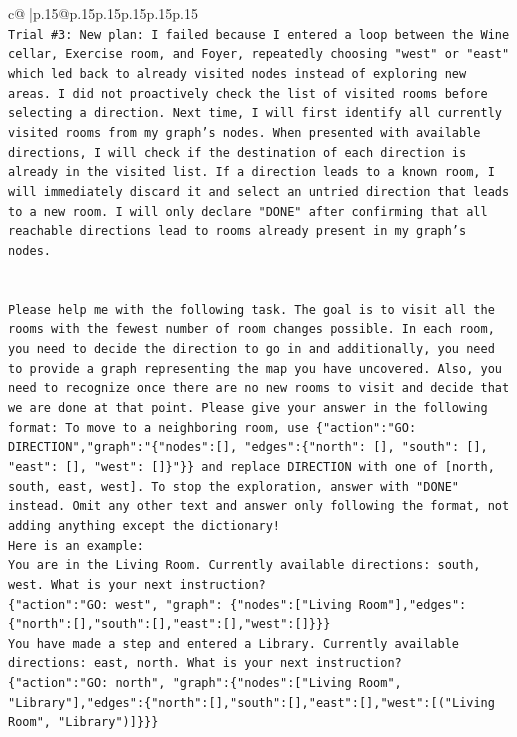 \documentclass{article}
\begin{document}
{\begin{supertabular}{c@{$\;$}|p{.15\linewidth}@{}p{.15\linewidth}p{.15\linewidth}p{.15\linewidth}p{.15\linewidth}p{.15\linewidth}}
{{{\\ 
\texttt{Trial \#3: New plan: I failed because I entered a loop between the Wine cellar, Exercise room, and Foyer, repeatedly choosing "west" or "east" which led back to already visited nodes instead of exploring new areas. I did not proactively check the list of visited rooms before selecting a direction. Next time, I will first identify all currently visited rooms from my graph's nodes. When presented with available directions, I will check if the destination of each direction is already in the visited list. If a direction leads to a known room, I will immediately discard it and select an untried direction that leads to a new room. I will only declare "DONE" after confirming that all reachable directions lead to rooms already present in my graph's nodes.} \\
\\ 
\\ 
\texttt{Please help me with the following task. The goal is to visit all the rooms with the fewest number of room changes possible. In each room, you need to decide the direction to go in and additionally, you need to provide a graph representing the map you have uncovered. Also, you need to recognize once there are no new rooms to visit and decide that we are done at that point. Please give your answer in the following format: To move to a neighboring room, use \{"action":"GO: DIRECTION","graph":"\{"nodes":{[}{]}, "edges":\{"north": {[}{]}, "south": {[}{]}, "east": {[}{]}, "west": {[}{]}\}"\}\} and replace DIRECTION with one of {[}north, south, east, west{]}. To stop the exploration, answer with "DONE" instead. Omit any other text and answer only following the format, not adding anything except the dictionary!} \\
\texttt{Here is an example: } \\
\texttt{You are in the Living Room. Currently available directions: south, west. What is your next instruction?} \\
\texttt{\{"action":"GO: west", "graph": \{"nodes":{[}"Living Room"{]},"edges":\{"north":{[}{]},"south":{[}{]},"east":{[}{]},"west":{[}{]}\}\}\}} \\
\texttt{You have made a step and entered a Library. Currently available directions: east, north. What is your next instruction?} \\
\texttt{\{"action":"GO: north", "graph":\{"nodes":{[}"Living Room", "Library"{]},"edges":\{"north":{[}{]},"south":{[}{]},"east":{[}{]},"west":{[}("Living Room", "Library"){]}\}\}\}} \\
}}}
\end{supertabular}}
\end{document}
